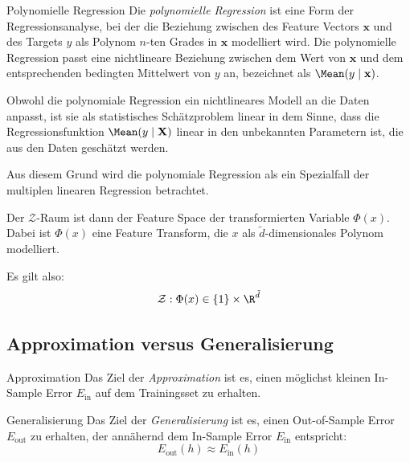 \begin{defi}{Polynomielle Regression}
    Die \emph{polynomielle Regression} ist eine Form der Regressionsanalyse, bei der die Beziehung zwischen des Feature Vectors $\mathbf{x}$ und des Targets $y$ als Polynom $n$-ten Grades in $\mathbf{x}$ modelliert wird.
    Die polynomielle Regression passt eine nichtlineare Beziehung zwischen dem Wert von $\mathbf{x}$ und dem entsprechenden bedingten Mittelwert von $y$ an, bezeichnet als $\Mean(y \mid \mathbf{x})$.

    Obwohl die polynomiale Regression ein nichtlineares Modell an die Daten anpasst, ist sie als statistisches Schätzproblem linear in dem Sinne, dass die Regressionsfunktion $\Mean(y \mid \mathbf{X})$ linear in den unbekannten Parametern ist, die aus den Daten geschätzt werden.

    Aus diesem Grund wird die polynomiale Regression als ein Spezialfall der multiplen linearen Regression betrachtet.

    Der $\mathcal{Z}$-Raum ist dann der Feature Space der transformierten Variable $\Phi(x)$.
    Dabei ist $\Phi(x)$ eine Feature Transform, die $x$ als $\tilde{d}$-dimensionales Polynom modelliert.

    Es gilt also:
    \[
        \mathcal{Z}: \Phi(x) \in \{ 1 \} \times \R^{\tilde{d}}
    \]
\end{defi}

\subsection{Approximation versus Generalisierung}

\begin{defi}{Approximation}
    Das Ziel der \emph{Approximation} ist es, einen möglichst kleinen In-Sample Error $E_\text{in}$ auf dem Trainingsset zu erhalten.
\end{defi}

\begin{defi}{Generalisierung}
    Das Ziel der \emph{Generalisierung} ist es, einen Out-of-Sample Error $E_\text{out}$ zu erhalten, der annähernd dem In-Sample Error $E_\text{in}$ entspricht:
    \[
        E_\text{out}(h) \approx E_\text{in}(h)
    \]
\end{defi}

